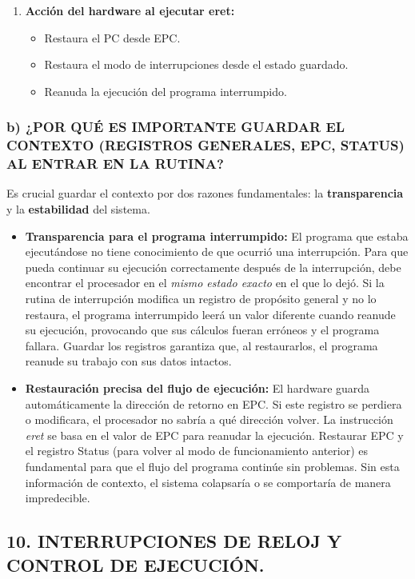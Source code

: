 \documentclass[12pt]{article}
\begin{document}
\begin{enumerate}
    \item \textbf{Acción del hardware al ejecutar eret:}
    \begin{itemize}
        \item Restaura el PC desde EPC.
        \item Restaura el modo de interrupciones desde el estado guardado.
        \item Reanuda la ejecución del programa interrumpido.
    \end{itemize}
\end{enumerate}

\subsubsection*{b) ¿POR QUÉ ES IMPORTANTE GUARDAR EL CONTEXTO (REGISTROS GENERALES, EPC, STATUS) AL ENTRAR EN LA RUTINA?}

Es crucial guardar el contexto por dos razones fundamentales: la \textbf{transparencia} y la \textbf{estabilidad} del sistema.

\begin{itemize}
    \item \textbf{Transparencia para el programa interrumpido:} El programa que estaba ejecutándose no tiene conocimiento de que ocurrió una interrupción. Para que pueda continuar su ejecución correctamente después de la interrupción, debe encontrar el procesador en el \textit{mismo estado exacto} en el que lo dejó. Si la rutina de interrupción modifica un registro de propósito general y no lo restaura, el programa interrumpido leerá un valor diferente cuando reanude su ejecución, provocando que sus cálculos fueran erróneos y el programa fallara. Guardar los registros garantiza que, al restaurarlos, el programa reanude su trabajo con sus datos intactos.
    
    \item \textbf{Restauración precisa del flujo de ejecución:} El hardware guarda automáticamente la dirección de retorno en EPC. Si este registro se perdiera o modificara, el procesador no sabría a qué dirección volver. La instrucción \textit{eret} se basa en el valor de EPC para reanudar la ejecución. Restaurar EPC y el registro Status (para volver al modo de funcionamiento anterior) es fundamental para que el flujo del programa continúe sin problemas. Sin esta información de contexto, el sistema colapsaría o se comportaría de manera impredecible.
\end{itemize}

\subsection*{10. INTERRUPCIONES DE RELOJ Y CONTROL DE EJECUCIÓN.}
\end{document}
